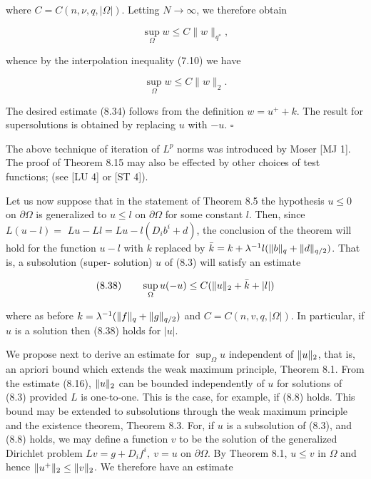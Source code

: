 where $C=C(n,\nu,q,|\Omega|)$. Letting $N\to\infty$, we therefore obtain

\begin{equation*}
\sup_{\Omega} w \le C\|w\|_{q^*},
\end{equation*}

whence by the interpolation inequality (7.10) we have

\begin{equation*}
\sup_{\Omega} w \le C\|w\|_2.
\end{equation*}


\pagestyle{empty}



\vspace{1em}

The desired estimate (8.34) follows from the definition $w=u^{+}+k$. The result for
supersolutions is obtained by replacing $u$ with $-u$. \hfill $\square$

\vspace{1.5em}

The above technique of iteration of $L^{p}$ norms was introduced by Moser [MJ 1].
The proof of Theorem 8.15 may also be effected by other choices of test functions;
(see [LU 4] or [ST 4]).

\vspace{1.5em}

Let us now suppose that in the statement of Theorem 8.5 the hypothesis $u\leq 0$
on $\partial\Omega$ is generalized to $u\leq l$ on $\partial\Omega$ for some constant $l$. Then, since $L(u-l)=$
$Lu-Ll=Lu-l(D_{i}b^{i}+d)$, the conclusion of the theorem will hold for the function
$u-l$ with $k$ replaced by $\bar{k}=k+\lambda^{-1}l(\lVert b\rVert_{q}+\lVert d\rVert_{q/2})$. That is, a subsolution (super-
solution) $u$ of (8.3) will satisfy an estimate

\vspace{0.5em}

\[
(8.38)\qquad \sup_{\Omega} u(-u)\leq C(\lVert u\rVert_{2}+\bar{k}+|l|)
\]

\vspace{0.5em}

where as before $k=\lambda^{-1}(\lVert f\rVert_{q}+\lVert g\rVert_{q/2})$ and $C=C(n,v,q,|\Omega|)$. In particular, if $u$ is a
solution then (8.38) holds for $|u|$.

\vspace{0.5em}

We propose next to derive an estimate for $\sup_{\Omega} u$ independent of $\lVert u\rVert_{2}$, that is, an
apriori bound which extends the weak maximum principle, Theorem 8.1. From the
estimate (8.16), $\lVert u\rVert_{2}$ can be bounded independently of $u$ for solutions of (8.3)
provided $L$ is one-to-one. This is the case, for example, if (8.8) holds. This bound
may be extended to subsolutions through the weak maximum principle and the
existence theorem, Theorem 8.3. For, if $u$ is a subsolution of (8.3), and (8.8) holds,
we may define a function $v$ to be the solution of the generalized Dirichlet problem
$Lv=g+D_{i}f^{i},\ v=u$ on $\partial\Omega$. By Theorem 8.1, $u\leq v$ in $\Omega$ and hence $\lVert u^{+}\rVert_{2}\leq \lVert v\rVert_{2}$. We
therefore have an estimate

